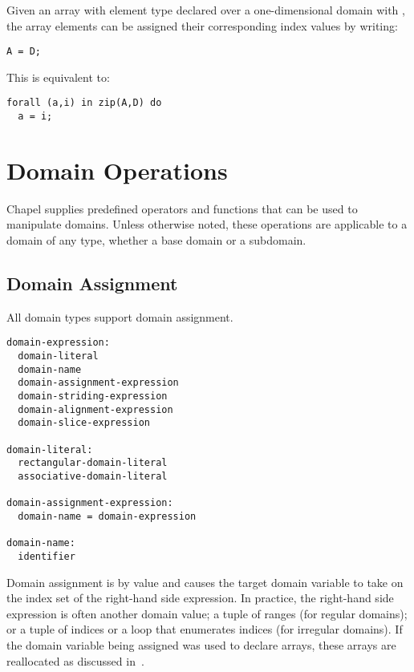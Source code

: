 \begin{example}
Given an array  with element type  declared over a
one-dimensional domain  with  , the
array elements can be assigned their corresponding index values by
writing:
\begin{chapel}
\begin{verbatim}
A = D;
\end{verbatim}
\end{chapel}
This is equivalent to:
\begin{chapel}
\begin{verbatim}
forall (a,i) in zip(A,D) do
  a = i;
\end{verbatim}
\end{chapel}
\end{example}


\section{Domain Operations}

Chapel supplies predefined operators and functions that can be used to manipulate
domains.  Unless otherwise noted, these operations are applicable to a domain of
any type, whether a base domain or a subdomain.

\subsection{Domain Assignment}
\label{Domain_Assignment}

All domain types support domain assignment.  

\begin{syntax}
\begin{verbatim}
domain-expression:
  domain-literal
  domain-name
  domain-assignment-expression
  domain-striding-expression
  domain-alignment-expression
  domain-slice-expression

domain-literal:
  rectangular-domain-literal
  associative-domain-literal

domain-assignment-expression:
  domain-name = domain-expression

domain-name:
  identifier
\end{verbatim}
\end{syntax}

Domain assignment is by
value and causes the target domain variable to take on the index set
of the right-hand side expression.  In practice, the right-hand side
expression is often another domain value; a tuple of ranges (for
regular domains); or a tuple of indices or a loop that enumerates
indices (for irregular domains).  If the domain variable being
assigned was used to declare arrays, these arrays are reallocated as
discussed in~.

